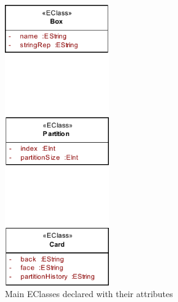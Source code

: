 \begin{stepbystep}
\begin{figure}[htbp]
	\centering
  \includegraphics[width=0.40\textwidth]{../../org.moflon.doc.handbook.02_leitnersLearningBox/2_staticSemantics/2_definingClasses/dcVisImages/ea_allAttributes}
	\caption{Main EClasses declared with their attributes}
	\label{ea:attribute_completed}
\end{figure}
\FloatBarrier

\end{stepbystep}
